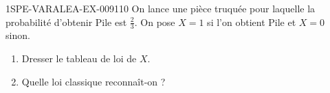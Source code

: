 \begin{exercice}{1SPE-VARALEA-EX-009}{1}{10}
On lance une pièce truquée pour laquelle la probabilité d'obtenir Pile est $\frac{2}{3}$. On pose $X = 1$ si l'on obtient Pile et $X = 0$ sinon.

\begin{enumerate}
  \item Dresser le tableau de loi de $X$.
  \item Quelle loi classique reconnaît-on ?
\end{enumerate}
\end{exercice}
